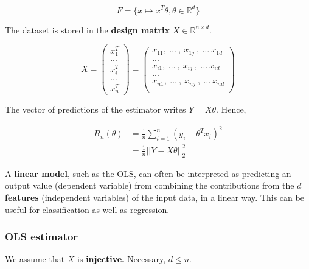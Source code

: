 \documentclass[
10pt, %
a4paper, %
oneside, %
headinclude,footinclude, %
BCOR5mm, %
]{scrartcl}
\begin{document}
\begin{equation*}
    F = \{ x\mapsto x^T \theta, \theta \in \mathbb{R}^d\}
\end{equation*}

The dataset is stored in the \textbf{{design matrix}} $X\in \mathbb{R}^{n\times d}$.

\begin{equation*}
X=
\begin{pmatrix}
x_{1}^T\\
...\\
x_{i}^T\\
...\\
x_{n}^T
\end{pmatrix}
=
\begin{pmatrix}
    x_{11}, \:\dots\:,\: x_{1j}\:, \:\dots\: x_{1d}\\
...\\
    x_{i1}, \:\dots\:,\: x_{ij}\:, \:\dots\: x_{id}\\
...\\
    x_{n1}, \:\dots\:,\: x_{nj}\:, \:\dots\: x_{nd}\\
\end{pmatrix}
\end{equation*}

The vector of predictions of the estimator writes $Y = X\theta$.  Hence,

\begin{equation*}
    \begin{aligned}
	R_n(\theta) &= \frac{1}{n} \sum^{n}_{i=1} (y_i-\theta^Tx_i)^2\\
	&= \frac{1}{n} ||Y-X\theta||_2^2
    \end{aligned}
\end{equation*}

\begin{remark}
    A \textbf{{linear model}}, such as the OLS, can often be interpreted as
    predicting an output value (dependent variable) from combining the contributions from the $d$
    \textbf{{features}} (independent variables) of the input data, in a linear
    way. This can be useful for classification as well as regression.
\end{remark}

\subsubsection{\large\color{Periwinkle}OLS estimator}

We assume that $X$ is \textbf{{injective.}}  Necessary, $d\leq n$.
\end{document}
